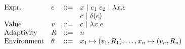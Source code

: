 \documentclass[a4paper,11pt]{article}
\newcommand{\wq}[1]{\textcolor[rgb]{.50,0.0,0.7}{ #1}}
\theoremstyle{definition}
\begin{document}

\[\begin{array}{llll}
\mbox{Expr.} & \expr & ::= & x ~|~ \expr_1 \eapp \expr_2 
 ~|~ \lambda x. \expr%
    \\
%
& & & %
\econst ~|~ \eop(\expr)  %
    \\
%
\mbox{Value} & \valr & ::= & \econst ~|~ \lambda x. \expr
    \\
%
  \mbox{Adaptivity} & \adapt& ::= & n\\
\mbox{Environment} & \env & ::= & x_1 \mapsto (\valr_1, \adapt_1), \ldots, x_n \mapsto (\valr_n,\adapt_n)
\end{array}\]
\end{document}
